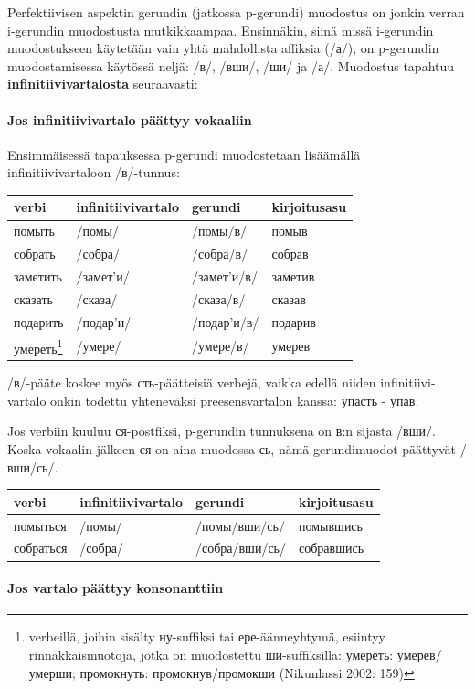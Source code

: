 \documentclass[]{scrartcl}
\begin{document}
Perfektiivisen aspektin gerundin (jatkossa p-gerundi) muodostus on
jonkin verran i-gerundin muodostusta mutkikkaampaa. Ensinnäkin, siinä
missä i-gerundin muodostukseen käytetään vain yhtä mahdollista affiksia
(/а/), on p-gerundin muodostamisessa käytössä neljä: /в/, /вши/, /ши/ ja
/а/. Muodostus tapahtuu \textbf{infinitiivivartalosta} seuraavasti:

\paragraph{Jos infinitiivivartalo päättyy
vokaaliin}\label{jos-infinitiivivartalo-puxe4uxe4ttyy-vokaaliin}

Ensimmäisessä tapauksessa p-gerundi muodostetaan lisäämällä
infinitiivivartaloon /в/-tunnus:

\begin{longtable}[c]{@{}llll@{}}
\toprule
verbi & infinitiivivartalo & gerundi & kirjoitusasu\tabularnewline
\midrule
\endhead
помыть & /помы/ & /помы/в/ & помыв\tabularnewline
собрать & /собра/ & /собра/в/ & собрав\tabularnewline
заметить & /замет'и/ & /замет'и/в/ & заметив\tabularnewline
сказать & /сказа/ & /сказа/в/ & сказав\tabularnewline
подарить & /подар'и/ & /подар'и/в/ & подарив\tabularnewline
умереть\footnote{verbeillä, joihin sisälty ну-suffiksi tai
  ере-äänneyhtymä, esiintyy rinnakkaismuotoja, jotka on muodostettu
  ши-suffiksilla: умереть: умерев/умерши; промокнуть: промокнув/промокши
  (Nikunlassi 2002: 159)} & /умере/ & /умере/в/ & умерев\tabularnewline
\bottomrule
\end{longtable}

/в/-pääte koskee myös сть-päätteisiä verbejä, vaikka edellä niiden
infinitiivi- vartalo onkin todettu yhteneväksi preesensvartalon kanssa:
упасть - упав.

Jos verbiin kuuluu ся-postfiksi, p-gerundin tunnuksena on в:n sijasta
/вши/. Koska vokaalin jälkeen ся on aina muodossa сь, nämä gerundimuodot
päättyvät /вши/сь/.

\begin{longtable}[c]{@{}llll@{}}
\toprule
verbi & infinitiivivartalo & gerundi & kirjoitusasu\tabularnewline
\midrule
\endhead
помыться & /помы/ & /помы/вши/сь/ & помывшись\tabularnewline
собраться & /собра/ & /собра/вши/сь/ & собравшись\tabularnewline
\bottomrule
\end{longtable}

\paragraph{Jos vartalo päättyy
konsonanttiin}\label{jos-vartalo-puxe4uxe4ttyy-konsonanttiin}
\end{document}
